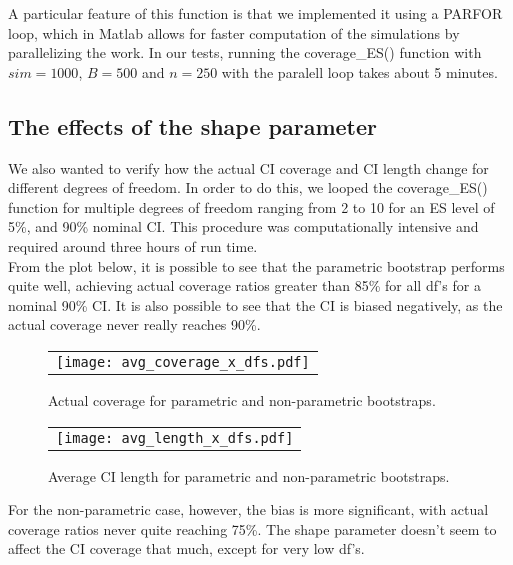 \documentclass[11pt, a4paper]{article}
\begin{document}
A particular feature of this function is that we implemented it using a PARFOR loop, which in Matlab allows for faster computation of the simulations by parallelizing the work. In our tests, running the coverage\_ES() function with  $sim = 1000$, $B = 500$ and $n = 250$ with the paralell loop takes about 5 minutes.\\

\subsection{The effects of the shape parameter}
We also wanted to verify how the actual CI coverage and CI length change for different degrees of freedom. In order to do this, we looped the coverage\_ES() function for multiple degrees of freedom ranging from 2 to 10 for an ES level of 5\%, and 90\% nominal CI. This procedure was computationally intensive and required around three hours of run time. \\

From the plot below, it is possible to see that the parametric bootstrap performs quite well, achieving actual coverage ratios greater than 85\% for all df's for a nominal 90\% CI. It is also possible to see that the CI is biased negatively, as the actual coverage never really reaches 90\%. \\

	\begin{figure}[!htb]\center 
		\begin{tabular}{c}
			\texttt{[image: avg\_coverage\_x\_dfs.pdf]}
		\end{tabular}
		\caption{\footnotesize Actual coverage for parametric and non-parametric bootstraps.}
		\label{fig8}
	\end{figure}

	\begin{figure}[!htb]\center 
		\begin{tabular}{c}
			\texttt{[image: avg\_length\_x\_dfs.pdf]}
		\end{tabular}
		\caption{\footnotesize Average CI length for parametric and non-parametric bootstraps.}
		\label{fig9}
	\end{figure}

For the non-parametric case, however, the bias is more significant, with actual coverage ratios never quite reaching 75\%. The shape parameter doesn't seem to affect the  CI coverage that much, except for very low df's. \\
\end{document}
